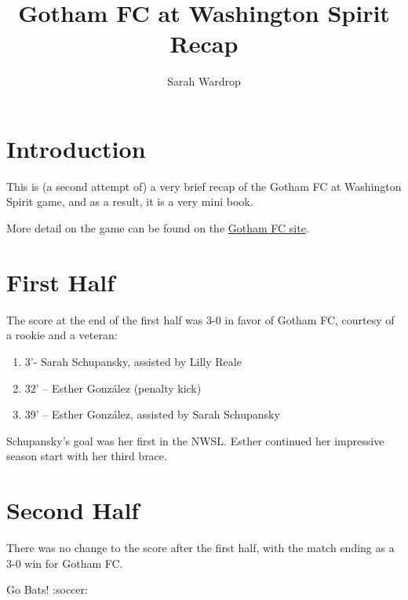 \documentclass[
  openany]{book}
\title{Gotham FC at Washington Spirit Recap}
\author{Sarah Wardrop}
\date{}
\providecommand{\tightlist}{%
  \setlength{\itemsep}{0pt}\setlength{\parskip}{0pt}}
\begin{document}
\maketitle

{
\setcounter{tocdepth}{1}
\tableofcontents
}
\chapter{Introduction}\label{introduction}

This is (a second attempt of) a very brief recap of the Gotham FC at Washington Spirit game, and as a result, it is a very mini book.

More detail on the game can be found on the \href{https://www.gothamfc.com/news/gotham-fc-caps-road-swing-with-victory-over-washington-spirit}{Gotham FC site}.

\chapter{First Half}\label{first-half}

The score at the end of the first half was 3-0 in favor of Gotham FC, courtesy of a rookie and a veteran:

\begin{enumerate}
\def\labelenumi{\arabic{enumi}.}
\tightlist
\item
  3'- Sarah Schupansky, assisted by Lilly Reale
\item
  32' -- Esther González (penalty kick)
\item
  39' -- Esther González, assisted by Sarah Schupansky
\end{enumerate}

Schupansky's goal was her first in the NWSL. Esther continued her impressive season start with her third brace.

\chapter{Second Half}\label{second-half}

There was no change to the score after the first half, with the match ending as a 3-0 win for Gotham FC.

Go Bats! :soccer:
\end{document}
